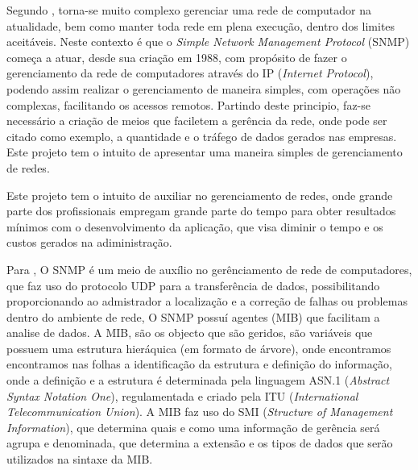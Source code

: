 \par Segundo , torna-se muito complexo
gerenciar uma rede de computador na atualidade, bem como manter toda 
rede em plena execução, dentro dos limites aceitáveis. 
Neste contexto é que o \textit{Simple Network Management Protocol} (SNMP) 
começa a atuar, desde sua criação em 1988, com propósito de fazer o 
gerenciamento da rede de computadores através do IP  
(\textit{Internet Protocol}), podendo assim realizar
o gerenciamento de maneira simples, com operações não complexas, 
facilitando os acessos remotos. Partindo deste principio, faz-se 
necessário a criação de meios que faciletem a gerência da rede, onde pode ser
citado como exemplo, a quantidade e o tráfego de dados gerados nas empresas. 
Este projeto tem o intuito de apresentar 
uma maneira simples de gerenciamento de redes.


\par Este projeto tem o intuito de auxiliar no gerenciamento de redes, onde
grande parte dos profissionais empregam grande parte do tempo para obter resultados mínimos com o
desenvolvimento da aplicação, que visa diminir o tempo e os custos gerados na adiministração.



Para , O SNMP é um meio de auxílio no
gerênciamento de rede de computadores, que faz uso do protocolo UDP para a
transferência de dados, possibilitando proporcionando ao admistrador a
localização e a correção de falhas ou problemas dentro do ambiente de rede, O
SNMP possuí agentes (MIB) que facilitam a analise de dados. A MIB, são os
objecto que são geridos, são variáveis que possuem uma estrutura hieráquica (em
formato de árvore), onde encontramos encontramos nas folhas a identificação da
estrutura e definição do informação, onde a definição e a estrutura é
determinada pela linguagem ASN.1 (\textit{Abstract Syntax Notation One}),
regulamentada e criado pela ITU (\textit{International Telecommunication
Union}). A MIB faz uso do SMI (\textit{Structure of Management Information}), 
que determina quais e como uma informação de gerência será agrupa e denominada, 
que determina a extensão e os tipos de dados que serão utilizados na sintaxe da MIB.

